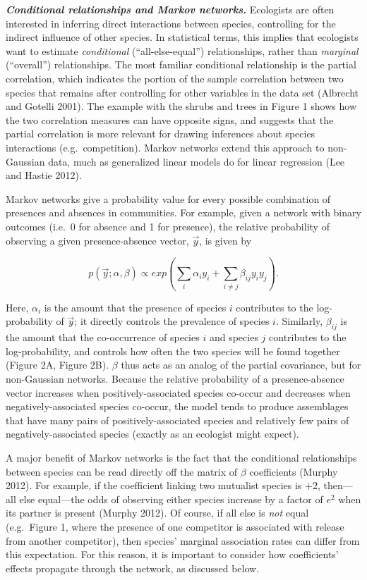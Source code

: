 \documentclass[12pt,]{article}
\begin{document}
\begin{spacing}{1.9}
\begin{flushleft}
\textbf{\emph{Conditional relationships and Markov networks.}}
Ecologists are often interested in inferring direct interactions between
species, controlling for the indirect influence of other species. In
statistical terms, this implies that ecologists want to estimate
\emph{conditional} (``all-else-equal'') relationships, rather than
\emph{marginal} (``overall'') relationships. The most familiar
conditional relationship is the partial correlation, which indicates the
portion of the sample correlation between two species that remains after
controlling for other variables in the data set (Albrecht and Gotelli
2001). The example with the shrubs and trees in Figure 1 shows how the
two correlation measures can have opposite signs, and suggests that the
partial correlation is more relevant for drawing inferences about
species interactions (e.g.~competition). Markov networks extend this
approach to non-Gaussian data, much as generalized linear models do for
linear regression (Lee and Hastie 2012).

Markov networks give a probability value for every possible combination
of presences and absences in communities. For example, given a network
with binary outcomes (i.e.~0 for absence and 1 for presence), the
relative probability of observing a given presence-absence vector,
\(\vec{y}\), is given by

\[p(\vec{y}; \alpha, \beta) \propto exp(\sum_{i}\alpha_i y_i + \sum_{i\neq j}\beta_{ij}y_i y_j).\]

Here, \(\alpha_{i}\) is the amount that the presence of species \(i\)
contributes to the log-probability of \(\vec{y}\); it directly controls
the prevalence of species \(i\). Similarly, \(\beta_{ij}\) is the amount
that the co-occurrence of species \(i\) and species \(j\) contributes to
the log-probability, and controls how often the two species will be
found together (Figure 2A, Figure 2B). \(\beta\) thus acts as an analog
of the partial covariance, but for non-Gaussian networks. Because the
relative probability of a presence-absence vector increases when
positively-associated species co-occur and decreases when
negatively-associated species co-occur, the model tends to produce
assemblages that have many pairs of positively-associated species and
relatively few pairs of negatively-associated species (exactly as an
ecologist might expect).

A major benefit of Markov networks is the fact that the conditional
relationships between species can be read directly off the matrix of
\(\beta\) coefficients (Murphy 2012). For example, if the coefficient
linking two mutualist species is \(+2\), then---all else equal---the
odds of observing either species increase by a factor of \(e^2\) when
its partner is present (Murphy 2012). Of course, if all else is
\emph{not} equal (e.g.~Figure 1, where the presence of one competitor is
associated with release from another competitor), then species' marginal
association rates can differ from this expectation. For this reason, it
is important to consider how coefficients' effects propagate through the
network, as discussed below.


\end{flushleft}
\end{spacing}
\end{document}
